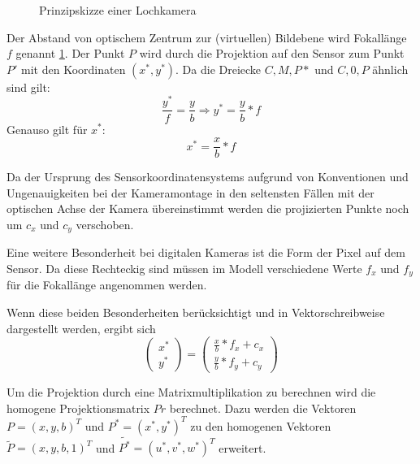 \begin{figure}[htpb]
  \centering
  \def\svgwidth{\textwidth}
  
  \caption{Prinzipskizze einer Lochkamera }
  \label{fig:Lochkamera}
\end{figure}


Der Abstand von optischem Zentrum zur (virtuellen) Bildebene wird Fokallänge
$f$ genannt \ref{fig:Lochkamera}. Der Punkt $P$ wird durch die Projektion auf
den Sensor zum Punkt $P'$ mit den Koordinaten $(x^*,y^*)$. Da die Dreiecke
$C,M,P*$ und $C,0,P$ ähnlich sind gilt: \begin{equation}
  \frac{y^*}{f}=\frac{y}{b} \Rightarrow y^*=\frac{y}{b}*f \end{equation}
Genauso gilt für $x^*$: \begin{equation} x^*=\frac{x}{b}*f \end{equation}

Da der Ursprung des Sensorkoordinatensystems aufgrund von Konventionen und
Ungenauigkeiten bei der Kameramontage in den seltensten Fällen mit der
optischen Achse der Kamera übereinstimmt werden die projizierten Punkte noch um
$c_x$ und $c_y$ verschoben.

Eine weitere Besonderheit bei digitalen Kameras ist die Form der Pixel auf dem
Sensor. Da diese Rechteckig sind müssen im Modell verschiedene Werte $f_x$ und
$f_y$ für die Fokallänge angenommen werden.\cite{Bradski2008}

Wenn diese beiden Besonderheiten berücksichtigt und in
Vektorschreibweise dargestellt werden, ergibt sich \begin{equation}
  \begin{pmatrix} x^*\\y^* \end{pmatrix} = \begin{pmatrix} \frac{x}{b}*f_x+c_x
    \\ \frac{y}{b}*f_y+c_y \end{pmatrix} \end{equation}


Um die Projektion durch eine Matrixmultiplikation zu berechnen wird die
homogene Projektionsmatrix $Pr$ berechnet. Dazu werden die Vektoren
$P=\left(x,y,b\right)^T$ und $P^*=\left(x^*,y^*\right)^T$ zu den homogenen
Vektoren $\tilde{P}=\left(x,y,b,1\right)^T$ und
$\tilde{P^*}=\left(u^*,v^*,w^*\right)^T$ erweitert.


